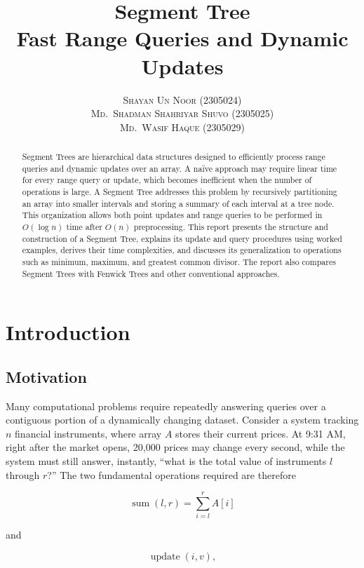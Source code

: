 \documentclass[11pt]{scrartcl}
\title{\textbf{\huge Segment Tree}\\[4pt]\large Fast Range Queries and Dynamic Updates}
\author{\textsc{Shayan Un Noor} (2305024) \\ \textsc{Md.\ Shadman Shahriyar Shuvo} (2305025) \\ \textsc{Md.\ Wasif Haque} (2305029)}
\date{}
\begin{document}
\maketitle
\tableofcontents


\newpage

\begin{abstract}
\noindent Segment Trees are hierarchical data structures designed to efficiently process range queries and dynamic updates over an array. A na\"ive approach may require linear time for every range query or update, which becomes inefficient when the number of operations is large. A Segment Tree addresses this problem by recursively partitioning an array into smaller intervals and storing a summary of each interval at a tree node. This organization allows both point updates and range queries to be performed in $O(\log n)$ time after $O(n)$ preprocessing. This report presents the structure and construction of a Segment Tree, explains its update and query procedures using worked examples, derives their time complexities, and discusses its generalization to operations such as minimum, maximum, and greatest common divisor. The report also compares Segment Trees with Fenwick Trees and other conventional approaches.
\end{abstract}

\section{Introduction}

\subsection{Motivation}
Many computational problems require repeatedly answering queries over a contiguous portion of a dynamically changing dataset. Consider a system tracking $n$ financial instruments, where array $A$ stores their current prices. At 9:31 AM, right after the market opens, 20{,}000 prices may change every second, while the system must still answer, instantly, ``what is the total value of instruments $l$ through $r$?'' The two fundamental operations required are therefore

\begin{equation}
\operatorname{sum}(l,r) = \sum_{i=l}^{r} A[i]
\label{eq:sum}
\end{equation}

and

\begin{equation}
\operatorname{update}(i,v),
\label{eq:update}
\end{equation}
\end{document}
